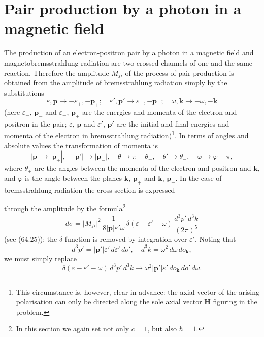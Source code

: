 
\section{Pair production by a photon in a magnetic field}


The production of an electron-positron pair by a photon in a magnetic field and magnetobremsstrahlung radiation are two crossed channels of one and the same reaction. Therefore the amplitude $M_{fi}$ of the process of pair production is obtained from the amplitude of bremsstrahlung radiation simply by the substitutions
\begin{equation}
\varepsilon, \mathbf{p} \to -\varepsilon_+, -\mathbf{p}_+; \quad \varepsilon', \mathbf{p}' \to \varepsilon_-, -\mathbf{p}_-; \quad \omega, \mathbf{k} \to -\omega, -\mathbf{k}
\label{eq:91.1}
\end{equation}
(here $\varepsilon_-$, $\mathbf{p}_-$ and $\varepsilon_+$, $\mathbf{p}_+$ are the energies and momenta of the electron and positron in the pair; $\varepsilon$, $\mathbf{p}$ and $\varepsilon'$, $\mathbf{p}'$ are the initial and final energies and momenta of the electron in bremsstrahlung radiation)\footnote{This circumstance is, however, clear in advance: the axial vector of the arising polarisation can only be directed along the sole axial vector $\mathbf{H}$ figuring in the problem.}. In terms of angles and absolute values the transformation of momenta is
\begin{equation}
|\mathbf{p}| \to |\mathbf{p}_+|, \quad |\mathbf{p}'| \to |\mathbf{p}_-|, \quad \theta \to \pi - \theta_+, \quad \theta' \to \theta_-, \quad \varphi \to \varphi - \pi,
\label{eq:91.2}
\end{equation}
where $\theta_\pm$ are the angles between the momenta of the electron and positron and $\mathbf{k}$, and $\varphi$ is the angle between the planes $\mathbf{k}$, $\mathbf{p}_+$ and $\mathbf{k}$, $\mathbf{p}_-$. In the case of bremsstrahlung radiation the cross section is expressed


through the amplitude by the formula\footnote{In this section we again set not only $c = 1$, but also $\hbar = 1$.}
\begin{equation}
d\sigma = |M_{fi}|^2\,\frac{1}{8|\mathbf{p}|\varepsilon'\omega}\,\delta(\varepsilon - \varepsilon' - \omega)\,\frac{d^3p'\,d^3k}{(2\pi)^5}
\label{eq:91.3}
\end{equation}
(see (64.25)); the $\delta$-function is removed by integration over $\varepsilon'$. Noting that
\[
d^3p' = |\mathbf{p}'|\varepsilon'\,d\varepsilon'\,do', \quad d^3k = \omega^2\,d\omega\,do_\mathbf{k},
\]
we must simply replace
\[
\delta(\varepsilon - \varepsilon' - \omega)\,d^3p'\,d^3k \to \omega^2|\mathbf{p}'|\varepsilon'\,do_\mathbf{k}\,do'\,d\omega.
\]


